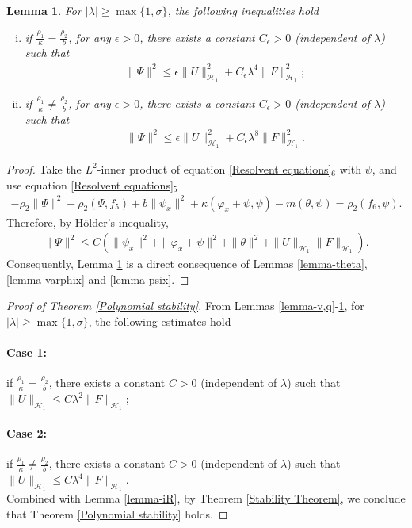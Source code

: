 \documentclass[11pt,reqno]{article}
\newtheorem{lemma}[theorem]{Lemma}
\begin{document}
  \begin{lemma}\label{lemma-Psi}
  	For $|\lambda| \geq \max\{1, \sigma\}$, the following inequalities hold
  	\begin{enumerate}[(i)]
  		\item if $\frac{\rho_1}{\kappa}=\frac{\rho_2}{b}$, for any $\epsilon>0$, there exists a constant $C_{\epsilon}>0$ (independent of $\lambda$) such that
  		\begin{align}
  			\|\Psi\|^2 \leq \epsilon\|U\|_{\mathcal{H}_1}^2 + C_{\epsilon} \lambda ^4 \|F\|_{\mathcal{H}_1}^2;
  		\end{align}
  		\item if $\frac{\rho_1}{\kappa} \neq \frac{\rho_2}{b}$, for any $\epsilon>0$, there exists a constant $C_{\epsilon}>0$ (independent of $\lambda$) such that
  		\begin{align}
  			\|\Psi\|^2 \leq \epsilon\|U\|_{\mathcal{H}_1}^2 + C_{\epsilon}\lambda ^8\|F\|_{\mathcal{H}_1}^2.
  		\end{align}
  	\end{enumerate}
  \end{lemma}
  \begin{proof}
  	Take the $L^2$-inner product of equation \eqref{Resolvent equations}$_6$ with $\psi$, and use equation \eqref{Resolvent equations}$_5$
  	\begin{align*}
  		-\rho_2\|\Psi\|^2 - \rho_2(\Psi,f_5) + b\|\psi_x\|^2 + \kappa(\varphi_x+\psi,\psi) - m(\theta,\psi) = \rho_2(f_6,\psi).
  	\end{align*}
  	Therefore, by H\"older's inequality,
  	\begin{align*}
  		\|\Psi\|^2 \leq C(\|\psi_x\|^2+\|\varphi_x+\psi\|^2+\|\theta\|^2+\|U\|_{\mathcal{H}_1}\|F\|_{\mathcal{H}_1}).
  	\end{align*}
  	Consequently, Lemma \ref{lemma-Psi} is a direct consequence of Lemmas \ref{lemma-theta}, \ref{lemma-varphix} and \ref{lemma-psix}.
  \end{proof}
  \begin{proof}[Proof of Theorem \ref{Polynomial stability}]
  From Lemmas \ref{lemma-v,q}-\ref{lemma-Psi}, for $|\lambda| \geq \max\{1, \sigma\}$, the following estimates hold
  \paragraph{Case 1:} if $\frac{\rho_1}{\kappa}=\frac{\rho_2}{b}$, there exists a constant $C> 0$ (independent of $\lambda$) such that $\|U\|_{\mathcal{H}_1} \leq C \lambda^2\|F\|_{\mathcal{H}_1}$;
  \paragraph{Case 2:} if $\frac{\rho_1}{\kappa} \neq \frac{\rho_2}{b}$, there exists a constant $C> 0$ (independent of $\lambda$) such that $\|U\|_{\mathcal{H}_1} \leq C \lambda^4\|F\|_{\mathcal{H}_1}$.\\
  Combined with Lemma \ref{lemma-iR}, by Theorem
  \ref{Stability Theorem}, we conclude that Theorem \ref{Polynomial stability} holds.
  \end{proof}
\end{document}
